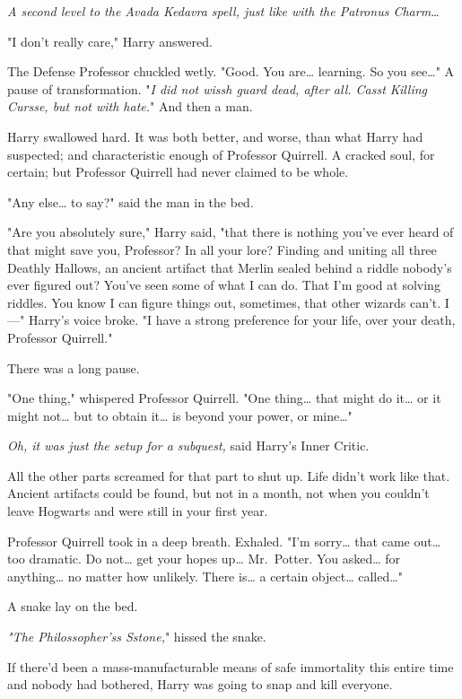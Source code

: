 \emph{A second level to the Avada Kedavra spell, just like with the Patronus Charm{\ldots}}

"I don't really care," Harry answered.

The Defense Professor chuckled wetly. "Good. You are{\ldots} learning. So you see{\ldots}" A pause of transformation. "\emph{I did not wissh guard dead, after all. Casst Killing Cursse, but not with hate.}" And then a man.

Harry swallowed hard. It was both better, and worse, than what Harry had suspected; and characteristic enough of Professor Quirrell. A cracked soul, for certain; but Professor Quirrell had never claimed to be whole.

"Any else{\ldots} to say?" said the man in the bed.

"Are you absolutely sure," Harry said, "that there is nothing you've ever heard of that might save you, Professor? In all your lore? Finding and uniting all three Deathly Hallows, an ancient artifact that Merlin sealed behind a riddle nobody's ever figured out? You've seen some of what I can do. That I'm good at solving riddles. You know I can figure things out, sometimes, that other wizards can't. I---" Harry's voice broke. "I have a strong preference for your life, over your death, Professor Quirrell."

There was a long pause.

"One thing," whispered Professor Quirrell. "One thing{\ldots} that might do it{\ldots} or it might not{\ldots} but to obtain it{\ldots} is beyond your power, or mine{\ldots}"

\emph{Oh, it was just the setup for a subquest,} said Harry's Inner Critic.

All the other parts screamed for that part to shut up. Life didn't work like that. Ancient artifacts could be found, but not in a month, not when you couldn't leave Hogwarts and were still in your first year.

Professor Quirrell took in a deep breath. Exhaled. "I'm sorry{\ldots} that came out{\ldots} too dramatic. Do not{\ldots} get your hopes up{\ldots} Mr.~Potter. You asked{\ldots} for anything{\ldots} no matter how unlikely. There is{\ldots} a certain object{\ldots} called{\ldots}"

A snake lay on the bed.

\emph{"The Philossopher'ss Sstone,}" hissed the snake.

If there'd been a mass-manufacturable means of safe immortality this entire time and nobody had bothered, Harry was going to snap and kill everyone.

